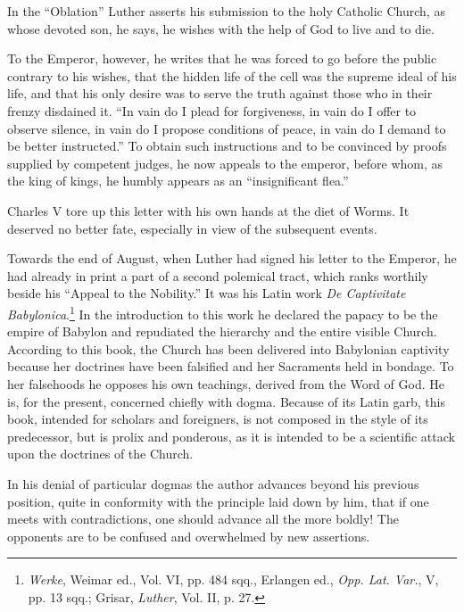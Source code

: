 In the “Oblation” Luther asserts his submission to the holy Catholic
Church, as whose devoted son, he says, he wishes with the help of God to
live and to die.

To the Emperor, however, he writes that he was forced to go before the
public contrary to his wishes, that the hidden life of the cell was the supreme
ideal of his life, and that his only desire was to serve the truth against those
who in their frenzy disdained it. “In vain do I plead for forgiveness, in vain
do I offer to observe silence, in vain do I propose conditions of peace, in vain
do I demand to be better instructed.” To obtain such instructions and to
be convinced by proofs supplied by competent judges, he now appeals to
the emperor, before whom, as the king of kings, he humbly appears as an
“insignificant flea.”

Charles V tore up this letter with his own hands at the diet of
Worms. It deserved no better fate, especially in view of the subsequent
events.

Towards the end of August, when Luther had signed his letter to
the Emperor, he had already in print a part of a second polemical
tract, which ranks worthily beside his “Appeal to the Nobility.” It
was his Latin work \textit{De Captivitate Babylonica}.\footnote
{\textit{Werke}, Weimar ed., Vol. VI, pp. 484 sqq., Erlangen ed., \textit{Opp. Lat. Var.}, V, pp. 13 sqq.;
Grisar, \textit{Luther}, Vol. II, p. 27.}
In the introduction
to this work he declared the papacy to be the empire of Babylon and
repudiated the hierarchy and the entire visible Church. According to
this book, the Church has been delivered into Babylonian captivity
because her doctrines have been falsified and her Sacraments held in
bondage. To her falsehoods he opposes his own teachings, derived
from the Word of God. He is, for the present, concerned chiefly with
dogma. Because of its Latin garb, this book, intended for scholars
and foreigners, is not composed in the style of its predecessor, but is
prolix and ponderous, as it is intended to be a scientific attack upon
the doctrines of the Church.

In his denial of particular dogmas the author advances beyond his
previous position, quite in conformity with the principle laid down
by him, that if one meets with contradictions, one should advance
all the more boldly! The opponents are to be confused and overwhelmed
by new assertions.

